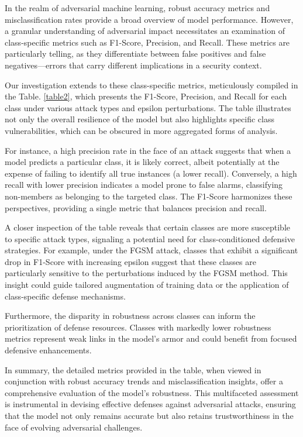 \documentclass[10pt, conference, a4paper, final]{IEEEtran}
\begin{document}
In the realm of adversarial machine learning, robust accuracy metrics and misclassification rates provide a broad overview of model performance. However, a granular understanding of adversarial impact necessitates an examination of class-specific metrics such as F1-Score, Precision, and Recall. These metrics are particularly telling, as they differentiate between false positives and false negatives—errors that carry different implications in a security context.

Our investigation extends to these class-specific metrics, meticulously compiled in the Table. \ref{table2}, which presents the F1-Score, Precision, and Recall for each class under various attack types and epsilon perturbations. The table illustrates not only the overall resilience of the model but also highlights specific class vulnerabilities, which can be obscured in more aggregated forms of analysis.

For instance, a high precision rate in the face of an attack suggests that when a model predicts a particular class, it is likely correct, albeit potentially at the expense of failing to identify all true instances (a lower recall). Conversely, a high recall with lower precision indicates a model prone to false alarms, classifying non-members as belonging to the targeted class. The F1-Score harmonizes these perspectives, providing a single metric that balances precision and recall.

A closer inspection of the table reveals that certain classes are more susceptible to specific attack types, signaling a potential need for class-conditioned defensive strategies. For example, under the FGSM attack, classes that exhibit a significant drop in F1-Score with increasing epsilon suggest that these classes are particularly sensitive to the perturbations induced by the FGSM method. This insight could guide tailored augmentation of training data or the application of class-specific defense mechanisms.

Furthermore, the disparity in robustness across classes can inform the prioritization of defense resources. Classes with markedly lower robustness metrics represent weak links in the model's armor and could benefit from focused defensive enhancements.

In summary, the detailed metrics provided in the table, when viewed in conjunction with robust accuracy trends and misclassification insights, offer a comprehensive evaluation of the model's robustness. This multifaceted assessment is instrumental in devising effective defenses against adversarial attacks, ensuring that the model not only remains accurate but also retains trustworthiness in the face of evolving adversarial challenges.
\end{document}
